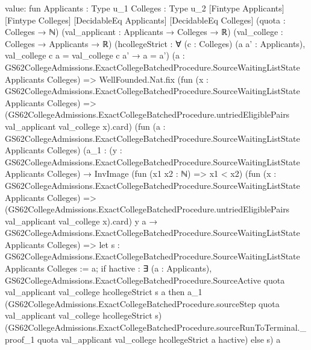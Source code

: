 \documentclass[10pt]{article}
\begin{document}
\begin{ReviewVerbatim}
value:
fun {Applicants : Type u_1} {Colleges : Type u_2} [Fintype Applicants] [Fintype Colleges] [DecidableEq Applicants]
    [DecidableEq Colleges] (quota : Colleges → ℕ) (val_applicant : Applicants → Colleges → ℝ)
    (val_college : Colleges → Applicants → ℝ)
    (hcollegeStrict : ∀ (c : Colleges) (a a' : Applicants), val_college c a = val_college c a' → a = a')
    (a : GS62CollegeAdmissions.ExactCollegeBatchedProcedure.SourceWaitingListState Applicants Colleges) =>
  WellFounded.Nat.fix
    (fun (x : GS62CollegeAdmissions.ExactCollegeBatchedProcedure.SourceWaitingListState Applicants Colleges) =>
      (GS62CollegeAdmissions.ExactCollegeBatchedProcedure.untriedEligiblePairs val_applicant val_college x).card)
    (fun (a : GS62CollegeAdmissions.ExactCollegeBatchedProcedure.SourceWaitingListState Applicants Colleges)
        (a_1 :
          (y : GS62CollegeAdmissions.ExactCollegeBatchedProcedure.SourceWaitingListState Applicants Colleges) →
            InvImage (fun (x1 x2 : ℕ) => x1 < x2)
                (fun
                    (x :
                      GS62CollegeAdmissions.ExactCollegeBatchedProcedure.SourceWaitingListState Applicants Colleges) =>
                  (GS62CollegeAdmissions.ExactCollegeBatchedProcedure.untriedEligiblePairs val_applicant val_college
                      x).card)
                y a →
              GS62CollegeAdmissions.ExactCollegeBatchedProcedure.SourceWaitingListState Applicants Colleges) =>
      let s : GS62CollegeAdmissions.ExactCollegeBatchedProcedure.SourceWaitingListState Applicants Colleges := a;
      if hactive :
          ∃ (a : Applicants),
            GS62CollegeAdmissions.ExactCollegeBatchedProcedure.SourceActive quota val_applicant val_college
              hcollegeStrict s a then
        a_1
          (GS62CollegeAdmissions.ExactCollegeBatchedProcedure.sourceStep quota val_applicant val_college hcollegeStrict
            s)
          (GS62CollegeAdmissions.ExactCollegeBatchedProcedure.sourceRunToTerminal._proof_1 quota val_applicant
            val_college hcollegeStrict a hactive)
      else s)
    a
\end{ReviewVerbatim}
\end{document}
